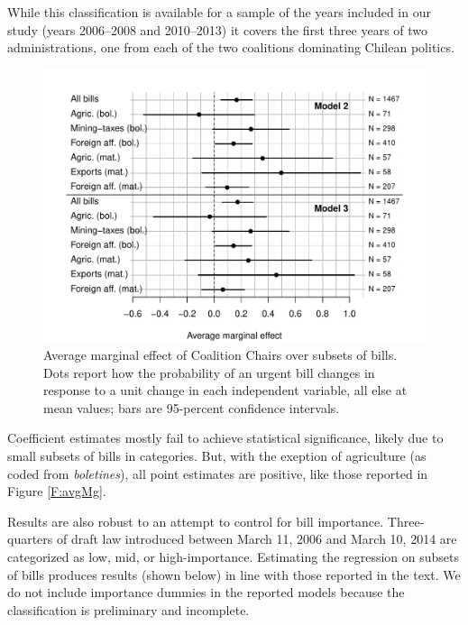 \documentclass[letter,12pt]{article}
\begin{document}
While this classification is available for a sample of the years included in our study (years 2006--2008 and 2010--2013) it covers the first three years of two administrations, one from each of the two coalitions dominating Chilean politics.



\begin{figure}
  \centering
    \caption{Average marginal effect of Coalition Chairs over subsets of bills. Dots report how the probability of an urgent bill changes in response to a unit change in each independent variable, all else at mean values; bars are 95-percent confidence intervals.}\label{F:avgMgSub}
    \includegraphics[width=.9\columnwidth]{../graphs/avgMgEffects-subsets.pdf}
\end{figure}

Coefficient estimates mostly fail to achieve statistical significance, likely due to small subsets of bills in categories. But, with the exeption of agriculture (as coded from \emph{boletines}), all point estimates are positive, like those reported in Figure \ref{F:avgMg}. 

Results are also robust to an attempt to control for bill importance. Three-quarters of draft law introduced between March 11, 2006 and March 10, 2014 are categorized as low, mid, or high-importance. Estimating the regression on subsets of bills produces results (shown below) in line with those reported in the text. We do not include importance dummies in the reported models because the classification is preliminary and incomplete. 
\end{document}

